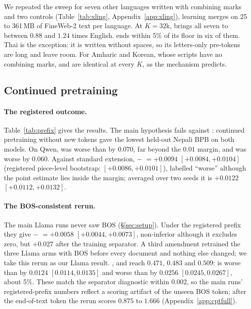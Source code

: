 We repeated the sweep for seven other languages written with combining marks and two controls (Table~\ref{tab:xling}, Appendix~\ref{app:xling}), learning merges on 25 to 361\,MB of FineWeb-2 text per language. At $K{=}32$k, \RII{} brings all seven to between $0.88$ and $1.24$ times English. \RI{} ends within 5\% of its floor in six of them. Thai is the exception: it is written without spaces, so its letters-only pre-tokens are long and leave \RI{} room. For Amharic and Korean, whose scripts have no combining marks, \RI{} and \RII{} are identical at every $K$, as the mechanism predicts.

\subsection{Continued pretraining}
\label{sec:cpt}

\paragraph{The registered outcome.} Table~\ref{tab:prefix} gives the results. The main hypothesis fails against \RO{}: continued pretraining without new tokens gave the lowest held-out Nepali BPB on both models. On Qwen, \RII{} was worse than \RO{} by $0.070$, far beyond the 0.01 margin, and \RI{} was worse by $0.060$. Against standard extension, \RII{} $-$ \RI{} $= +0.0094$ $[+0.0084, +0.0104]$ (registered piece-level bootstrap: $[+0.0086, +0.0101]$), labelled ``worse'' although the point estimate lies inside the margin; averaged over two seeds it is $+0.0122$ $[+0.0112, +0.0132]$.

\paragraph{The BOS-consistent rerun.} The main Llama runs never saw BOS (\S\ref{sec:setup}). Under the registered prefix they give \RII{} $-$ \RI{} $= +0.0058$ $[+0.0044, +0.0073]$, non-inferior although it excludes zero, but $+0.027$ after the training separator. A third amendment retrained the three Llama arms with BOS before every document and nothing else changed; we take this rerun as our Llama result. \RO{}, \RI{} and \RII{} reach $0.471$, $0.483$ and $0.509$: \RI{} is worse than \RO{} by $0.0124$ $[0.0114, 0.0135]$ and \RII{} worse than \RI{} by $0.0256$ $[0.0245, 0.0267]$, about 5\%. These match the separator diagnostic within $0.002$, so the main runs' registered-prefix numbers reflect a scoring artifact of the unseen BOS token; after the end-of-text token the rerun scores $0.875$ to $1.666$ (Appendix~\ref{app:cptfull}).


